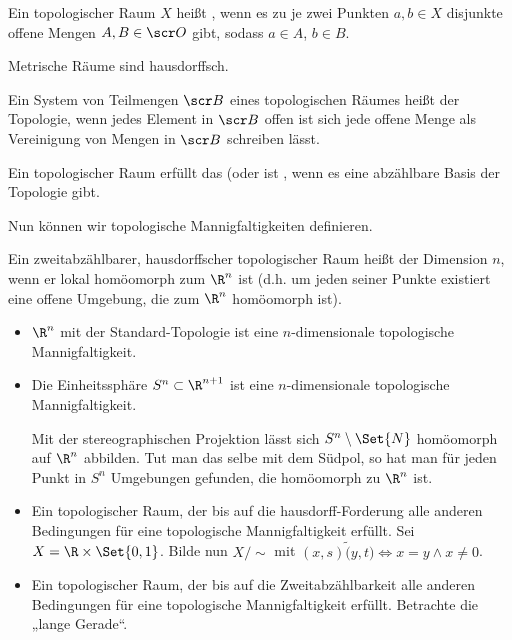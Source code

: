 \begin{df} \label{1.2} %
    Ein topologischer Raum $X$ heißt , wenn es zu je zwei Punkten $a, b \in X$ disjunkte offene Mengen $A, B \in \scr O$ gibt, sodass $a \in A$, $b \in B$.
    \begin{note}
        Metrische Räume sind hausdorffsch.
    \end{note}
\end{df}

\begin{df} \label{1.3} %
    Ein System von Teilmengen $\scr B$ eines topologischen Räumes heißt  der Topologie, wenn jedes Element in $\scr B$ offen ist sich jede offene Menge als Vereinigung von Mengen in $\scr B$ schreiben lässt.

    Ein topologischer Raum erfüllt das  (oder ist , wenn es eine abzählbare Basis der Topologie gibt.
\end{df}

Nun können wir topologische Mannigfaltigkeiten definieren.

\begin{df} \label{1.4} %
    Ein zweitabzählbarer, hausdorffscher topologischer Raum heißt  der Dimension $n$, wenn
    er lokal homöomorph zum $\R^n$ ist (d.h. um jeden seiner Punkte existiert eine offene Umgebung, die zum $\R^n$ homöomorph ist).
\end{df}

\begin{ex*}
    \begin{itemize}
        \item
            $\R^n$ mit der Standard-Topologie ist eine $n$-dimensionale topologische Mannigfaltigkeit.
        \item
            Die Einheitssphäre $S^n \subset \R^{n+1}$ ist eine $n$-dimensionale topologische Mannigfaltigkeit.

            Mit der stereographischen Projektion lässt sich $S^n \setminus \Set{N}$ homöomorph auf $\R^n$ abbilden.
            Tut man das selbe mit dem Südpol, so hat man für jeden Punkt in $S^n$ Umgebungen gefunden, die homöomorph zu $\R^n$ ist.
        \item
            Ein topologischer Raum, der bis auf die hausdorff-Forderung alle anderen Bedingungen für eine topologische Mannigfaltigkeit erfüllt.
            Sei $X = \R \times \Set{0, 1}$.
            Bilde nun $X / \sim$ mit $(x,s) \tilde (y, t) \iff x = y \land x \neq 0$.
        \item
            Ein topologischer Raum, der bis auf die Zweitabzählbarkeit alle anderen Bedingungen für eine topologische Mannigfaltigkeit erfüllt.
            Betrachte die „lange Gerade“.
    \end{itemize}
\end{ex*}


